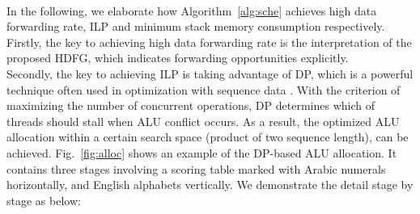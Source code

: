 \\\indent
In the following, we elaborate how Algorithm~\ref{alg:sche} achieves high data forwarding rate, ILP and minimum stack memory consumption respectively.
Firstly, the key to achieving high data forwarding rate is the interpretation of the proposed HDFG, 
which indicates forwarding opportunities explicitly.
\\\indent
Secondly, the key to achieving ILP is taking advantage of DP, which is a powerful technique often used in optimization with sequence data \cite{dpseq}.
With the criterion of maximizing the number of concurrent operations, DP determines which of threads should stall when ALU conflict occurs.
As a result, the optimized ALU allocation within a certain search space (product of two sequence length), can be achieved.
Fig.~\ref{fig:alloc} shows an example of the DP-based ALU allocation.
It contains three stages involving a scoring table marked with Arabic numerals horizontally, and English alphabets vertically.
We demonstrate the detail stage by stage as below:

